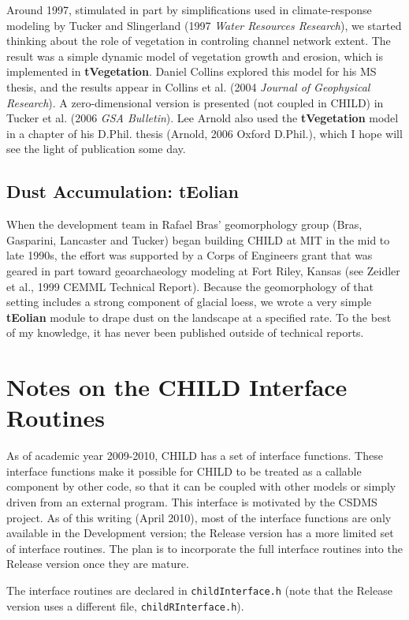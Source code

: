 \documentclass[12pt]{article}
\begin{document}
Around 1997, stimulated in part by simplifications used in climate-response
modeling by Tucker and Slingerland (1997 {\em Water Resources Research}), we started thinking about the role
of vegetation in controling channel network extent. The result was a simple
dynamic model of vegetation growth and erosion, which is implemented in
{\bf tVegetation}. Daniel Collins explored this model for his MS thesis, 
and the results appear in Collins et al. (2004 {\em Journal of Geophysical Research}). A zero-dimensional version
is presented (not coupled in CHILD) in Tucker et al. (2006 {\em GSA Bulletin}). Lee Arnold also
used the {\bf tVegetation} model in a chapter of his D.Phil. thesis
(Arnold, 2006 Oxford D.Phil.), which I hope will see the light of publication some day.

\subsection{Dust Accumulation: tEolian}

When the development team in Rafael Bras' geomorphology group (Bras, Gasparini, Lancaster and Tucker) began building CHILD at MIT in the mid to late 1990s, 
the effort was supported by a Corps of Engineers grant that was geared in part toward
geoarchaeology modeling at Fort Riley, Kansas (see Zeidler et al., 1999 CEMML Technical Report).
Because the geomorphology of that setting includes a strong component of 
glacial loess, we wrote a very simple {\bf tEolian} module to drape dust on
the landscape at a specified rate. To the best of my knowledge, it has 
never been published outside of technical reports.

\section{Notes on the CHILD Interface Routines}

As of academic year 2009-2010, CHILD has a set of interface functions. These interface functions make it possible for CHILD to be treated as a callable component by other code, so that it can be coupled with other models or simply driven from an external program. This interface is motivated by the CSDMS project. As of this writing (April 2010), most of the interface functions are only available in the Development version; the Release version has a more limited set of interface routines. The plan is to incorporate the full interface routines into the Release version once they are mature.

The interface routines are declared in {\tt childInterface.h} (note that the Release version uses a different file, {\tt childRInterface.h}).
\end{document}
